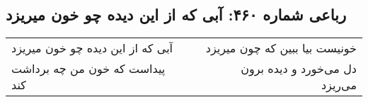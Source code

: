 \begin{center}
\section*{رباعی شماره ۴۶۰: آبی که از این دیده چو خون میریزد}
\label{sec:0460}
\begin{longtable}{l p{0.5cm} r}
آبی که از این دیده چو خون میریزد
&&
خونیست بیا ببین که چون میریزد
\\
پیداست که خون من چه برداشت کند
&&
دل می‌خورد و دیده برون می‌ریزد
\\
\end{longtable}
\end{center}
